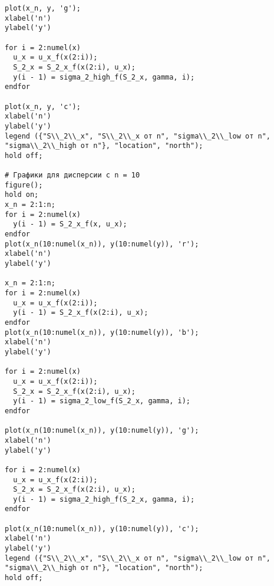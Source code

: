 \begin{lstlisting}
plot(x_n, y, 'g');
xlabel('n')
ylabel('y')

for i = 2:numel(x)
  u_x = u_x_f(x(2:i));
  S_2_x = S_2_x_f(x(2:i), u_x);
  y(i - 1) = sigma_2_high_f(S_2_x, gamma, i);
endfor

plot(x_n, y, 'c');
xlabel('n')
ylabel('y')
legend ({"S\\_2\\_x", "S\\_2\\_x от n", "sigma\\_2\\_low от n", "sigma\\_2\\_high от n"}, "location", "north");
hold off;

# Графики для дисперсии с n = 10
figure();
hold on;
x_n = 2:1:n;
for i = 2:numel(x)
  y(i - 1) = S_2_x_f(x, u_x);
endfor
plot(x_n(10:numel(x_n)), y(10:numel(y)), 'r');
xlabel('n')
ylabel('y')

x_n = 2:1:n;
for i = 2:numel(x)
  u_x = u_x_f(x(2:i));
  y(i - 1) = S_2_x_f(x(2:i), u_x);
endfor
plot(x_n(10:numel(x_n)), y(10:numel(y)), 'b');
xlabel('n')
ylabel('y')

for i = 2:numel(x)
  u_x = u_x_f(x(2:i));
  S_2_x = S_2_x_f(x(2:i), u_x);
  y(i - 1) = sigma_2_low_f(S_2_x, gamma, i);
endfor

plot(x_n(10:numel(x_n)), y(10:numel(y)), 'g');
xlabel('n')
ylabel('y')

for i = 2:numel(x)
  u_x = u_x_f(x(2:i));
  S_2_x = S_2_x_f(x(2:i), u_x);
  y(i - 1) = sigma_2_high_f(S_2_x, gamma, i);
endfor

plot(x_n(10:numel(x_n)), y(10:numel(y)), 'c');
xlabel('n')
ylabel('y')
legend ({"S\\_2\\_x", "S\\_2\\_x от n", "sigma\\_2\\_low от n", "sigma\\_2\\_high от n"}, "location", "north");
hold off;
\end{lstlisting}